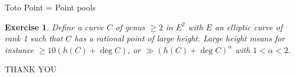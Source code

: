 \documentclass[handout]{beamer}
\newtheorem{ex}{Exercise}
\begin{document}
\begin{comment}
	\begin{frame}{Ongoing work}
		
		\begin{tcolorbox}	
			\begin{itemize}
				
				
				\item \textcolor{red}{In relation to TASK 1} 
				
				With Lombardo and Pengo we investigate possible uniform bounds for Serre's constant.
				
				
				\pause
				
				\item  \textcolor{red}{In relation to TASK 2} 
				
				
				Work on the  Torsion Anomalous Conjecture for varieties.
				
				A part for curves and hypersurfaces and subvarieties of  codimension 2 in $E^N$ the TAC is not known.
				
				With Pengo we obtained some partial results for transverse varieties in $E^N$.
				
				
			\end{itemize}
		\end{tcolorbox}	
	\end{frame}
\end{comment}

\begin{frame}{Toto Point = Point pools}
\begin{ex}
Define a curve $C$ of genus $\ge2$ in $E^2$ with $E$ an elliptic curve of rank 1 such that $C$ has a rational point of large height.
Large height means for instance $\ge 10 ( h(C) + \deg C)$, or $\gg ( h(C) + \deg C)^\alpha$ with $1 < \alpha < 2$. 
\end{ex}
\end{frame}

\begin{frame}
\centerline{\Huge{THANK YOU}}
\end{frame}
\end{document}
